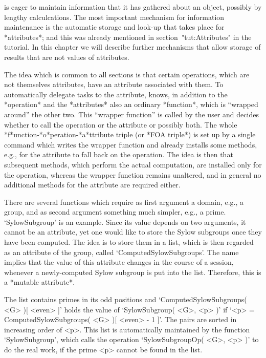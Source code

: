 
{\GAP}  is eager  to maintain information  that  it has gathered about an
object, possibly by lengthy  calculcations. The most  important mechanism
for information maintenance  is the  automatic  storage and look-up  that
takes  place  for  *attributes*; and    this   was already mentioned   in
section~"tut:Attributes"  in the   tutorial. In   this  chapter  we  will
describe further mechanisms that  allow storage of  results that  are not
values of attributes.

%
The  idea which is   common to all  sections  is that certain operations,
which are  not themselves attributes, have  an attribute  associated with
them. To automatically delegate tasks to the  attribute, {\GAP} knows, in
addition  to  the *operation*  and  the  *attributes*   also an  ordinary
*function*, which  is  ``wrapped around'' the  other  two. This ``wrapper
function''  is called by    the user and    decides whether to  call  the
operation    or  the    attribute     or  possibly     both.   The  whole
*f*unction-*o*peration-*a*ttribute triple (or *FOA triple*)  is set up by
a single   {\GAP} command which  writes the  wrapper function and already
installs  some methods,  e.g.,  for the attribute  to   fall back on  the
operation. The idea  is then that subsequent  methods, which  perform the
actual computation, are installed   only for the operation,   whereas the
wrapper function remains unaltered, and  in general no additional methods
for the attribute are required either.


There  are several functions  which  require as first  argument a domain,
e.g., a  group, and as second  argument  something much simpler,  e.g., a
prime. `SylowSubgroup'  is an  example. Since  its  value depends  on two
arguments, it cannot be  an attribute,  yet one would  like to  store the
Sylow subgroups once they have been  computed. The idea  is to store them
in a list,  which is then regarded as  an attribute of the  group, called
`ComputedSylowSubgroups'. The  name    implies that  the  value  of  this
attribute  changes in    the  course of   a  {\GAP}  session,  whenever a
newly-computed Sylow subgroup is put into the  list. Therefore, this is a
*mutable attribute*.

The   list    contains    primes     in    its   odd   positions      and
`ComputedSylowSubgroups(  <G> )[  <even>     ]'   holds the  value     of
`SylowSubgroup( <G>,  <p>  )' if  `<p> =  ComputedSylowSubgroups(  <G> )[
<even> - 1 ]'. The pairs are sorted in increasing order of <p>. This list
is automatically maintained by the  function `SylowSubgroup', which calls
the operation `SylowSubgroupOp(  <G>, <p> )' to do  the real work, if the
prime <p> cannot be found in the list.

